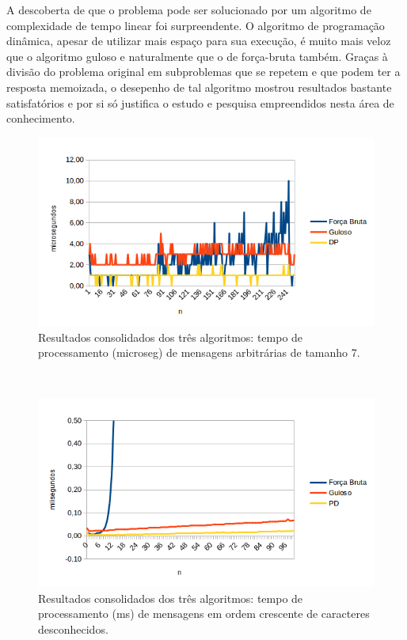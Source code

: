 \documentclass[a4paper,12pt,titlepage]{article}
\begin{document}
A descoberta de que o problema pode ser solucionado por um algoritmo de complexidade de tempo linear foi surpreendente. O algoritmo de programação dinâmica, apesar de utilizar mais espaço para sua execução, é muito mais veloz que o algoritmo guloso e naturalmente que o de força-bruta também. Graças à divisão do problema original em subproblemas que se repetem e que podem ter a resposta memoizada, o desepenho de tal algoritmo mostrou resultados bastante satisfatórios e por si só justifica o estudo e pesquisa empreendidos nesta área de conhecimento.


\begin{figure}[H]
     \centering
     \includegraphics[scale=0.9]{figures/chart-all-all.png}
     \caption{Resultados consolidados dos três algoritmos: tempo de processamento (microseg) de mensagens arbitrárias de tamanho 7. }
\end{figure}

\ \\

\begin{figure}[H]
     \centering
     \includegraphics[scale=0.9]{figures/chart-all-three.png}
     \caption{Resultados consolidados dos três algoritmos: tempo de processamento (ms) de mensagens em ordem crescente de caracteres desconhecidos.}
\end{figure}

\end{document}
